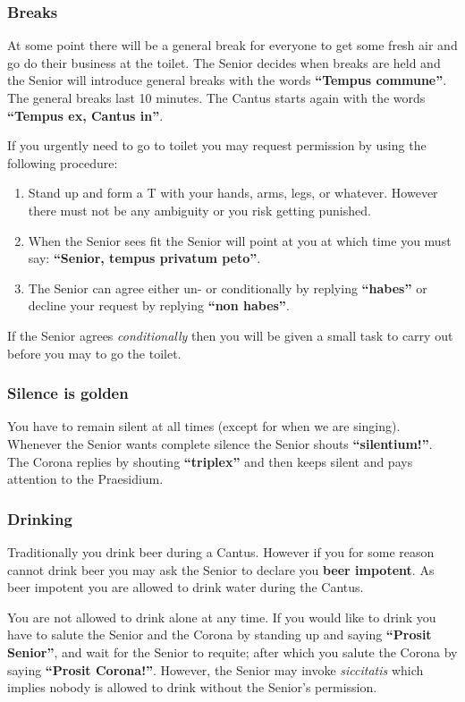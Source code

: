 \subsubsection*{Breaks}
At some point there will be a general break for everyone to get some fresh air and go do their business at the toilet. The Senior decides when breaks are held and the Senior will introduce general breaks with the words \textbf{``Tempus commune''}. The general breaks last 10 minutes. The Cantus starts again with the words \textbf{``Tempus ex, Cantus in''}.

If you urgently need to go to toilet you may request permission by using the following procedure:
\begin{enumerate}
        \item Stand up and form a T with your hands, arms, legs, or whatever. However there must not be any ambiguity or you risk getting punished.
        \item When the Senior sees fit the Senior will point at you at which time you must say: \textbf{``Senior, tempus privatum peto''}.
        \item The Senior can agree either un- or conditionally by replying \textbf{``habes''} or decline your request by replying \textbf{``non habes''}.
\end{enumerate}
If the Senior agrees \emph{conditionally} then you will be given a small task to carry out before you may to go the toilet.

\subsubsection*{Silence is golden}
You have to remain silent at all times (except for when we are singing).
Whenever the Senior wants complete silence the Senior shouts \textbf{``silentium!''}. The Corona replies by shouting \textbf{``triplex''} and then keeps silent and pays attention to the Praesidium.

\subsubsection*{Drinking}
Traditionally you drink beer during a Cantus.
However if you for some reason cannot drink beer you may ask the Senior to declare you \textbf{beer impotent}. As beer impotent you are allowed to drink water during the Cantus.

You are not allowed to drink alone at any time.
If you would like to drink you have to salute the Senior and the Corona by standing up and saying \textbf{``Prosit Senior''}, and wait for the Senior to requite; after which you salute the Corona by saying \textbf{``Prosit Corona!''}.
However, the Senior may invoke \emph{siccitatis} which implies nobody is allowed to drink without the Senior's permission.

